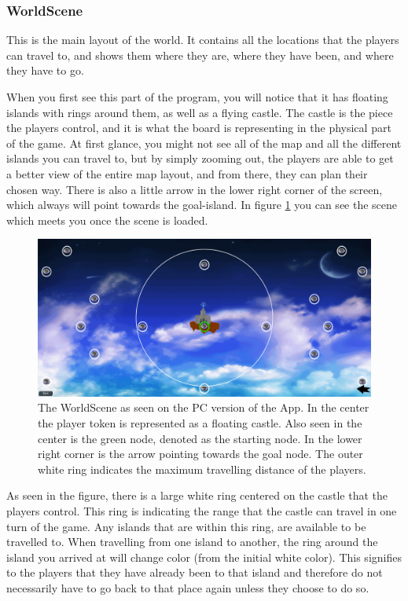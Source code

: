 \subsubsection{WorldScene}
\label{sec:worldscene}
This is the main layout of the world. It contains all the locations that the players can travel to, and shows them where they are, where they have been, and where they have to go.

When you first see this part of the program, you will notice that it has floating islands with rings around them, as well as a flying castle. The castle is the piece the players control, and it is what the board is representing in the physical part of the game.
At first glance, you might not see all of the map and all the different islands you can travel to, but by simply zooming out, the players are able to get a better view of the entire map layout, and from there, they can plan their chosen way. There is also a little arrow in the lower right corner of the screen, which always will point towards the goal-island. 
In figure \ref{fig:worldSc} you can see the scene which meets you once the scene is loaded.

\begin{figure}[h]
    \centering
    \includegraphics[scale=0.3]{Images/WorldScene.png}
    \caption{The WorldScene as seen on the PC version of the App. In the center the player token is represented as a floating castle. Also seen in the center is the green node, denoted as the starting node. In the lower right corner is the arrow pointing towards the goal node. The outer white ring indicates the maximum travelling distance of the players.}
    \label{fig:worldSc}
\end{figure}

As seen in the figure, there is a large white ring centered on the castle that the players control. This ring is indicating the range that the castle can travel in one turn of the game. Any islands that are within this ring, are available to be travelled to.
When travelling from one island to another, the ring around the island you arrived at will change color (from the initial white color). This signifies to the players that they have already been to that island and therefore do not necessarily have to go back to that place again unless they choose to do so.

